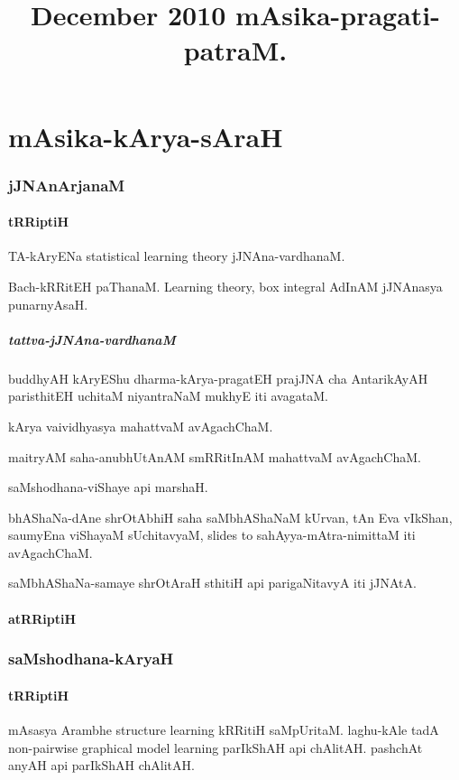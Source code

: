 \documentclass[oneside, article]{memoir}
\title{December 2010 mAsika-pragati-patraM.}
\date{}
\begin{document}
\maketitle
 
\part{mAsika-kArya-sAraH}
\section{jJNAnArjanaM}
\subsection{tRRiptiH}
TA-kAryENa statistical learning theory jJNAna-vardhanaM.

Bach-kRRitEH paThanaM. Learning theory, box integral AdInAM jJNAnasya punarnyAsaH.

\subsubsection{tattva-jJNAna-vardhanaM}
buddhyAH kAryEShu dharma-kArya-pragatEH prajJNA cha AntarikAyAH paristhitEH uchitaM niyantraNaM mukhyE iti avagataM.

kArya vaividhyasya mahattvaM avAgachChaM.

maitryAM saha-anubhUtAnAM smRRitInAM mahattvaM avAgachChaM.

saMshodhana-viShaye api marshaH.

bhAShaNa-dAne shrOtAbhiH saha saMbhAShaNaM kUrvan, tAn Eva vIkShan, saumyEna viShayaM sUchitavyaM, slides to sahAyya-mAtra-nimittaM iti avAgachChaM.

saMbhAShaNa-samaye shrOtAraH sthitiH api parigaNitavyA iti jJNAtA.

\subsection{atRRiptiH}


\section{saMshodhana-kAryaH}
\subsection{tRRiptiH}
mAsasya Arambhe structure learning kRRitiH saMpUritaM. laghu-kAle tadA non-pairwise graphical model learning parIkShAH api chAlitAH. pashchAt anyAH api parIkShAH chAlitAH.
\end{document}
